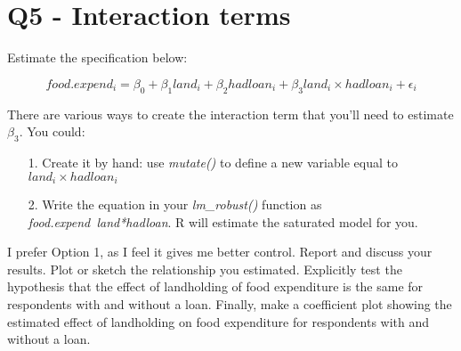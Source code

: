\documentclass[12pt]{article}		%
\begin{document}
\section*{Q5 - Interaction terms}

Estimate the specification below:

$$food.expend_i = \beta_0 + \beta_1 land_i + \beta_2 hadloan_i + \beta_3 land_i \times hadloan_i + \epsilon_i$$
 
There are various ways to create the interaction term that you'll need to estimate $\beta_3$. You could:
\begin{itemize}
	\item[1.] Create it by hand: use \textit{mutate()} to define a new variable equal to $land_i \times hadloan_i$
	\item[2.] Write the equation in your \textit{lm\_robust()} function as \textit{food.expend~land*hadloan}. R will estimate the saturated model for you.
\end{itemize}

I prefer Option 1, as I feel it gives me better control. Report and discuss your results. Plot or sketch the relationship you estimated. Explicitly test the hypothesis that the effect of landholding of food expenditure is the same for respondents with and without a loan. Finally, make a coefficient plot showing the estimated effect of landholding on food expenditure for respondents with and without a loan. 

	
\end{document}
